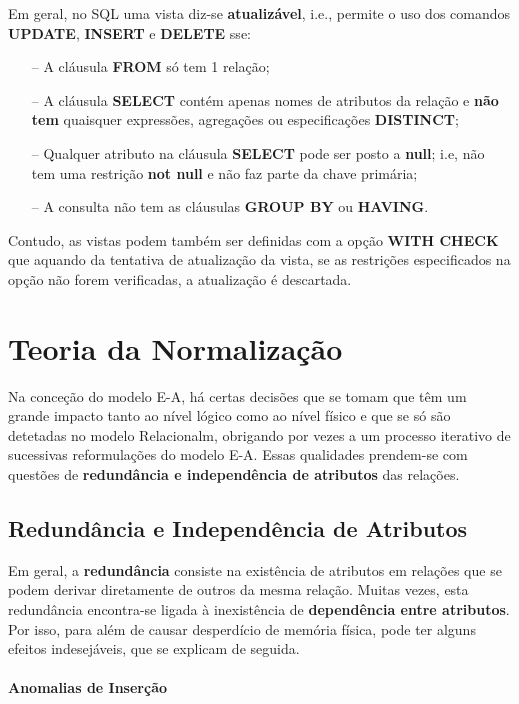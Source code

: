 \documentclass[oneside]{book}
\theoremstyle{definition}
\begin{document}
Em geral, no SQL uma vista diz-se \textbf{atualizável}, i.e., permite o uso dos comandos \textbf{UPDATE}, \textbf{INSERT} e \textbf{DELETE} sse:
\begin{itemize}
    \itemsep0cm
    \item[--] A cláusula \textbf{FROM} só tem 1 relação;
    \item[--] A cláusula \textbf{SELECT} contém apenas nomes de atributos da relação e \textbf{não tem} quaisquer expressões, agregações ou especificações \textbf{DISTINCT};
    \item[--] Qualquer atributo na cláusula \textbf{SELECT} pode ser posto a \textbf{null}; i.e, não tem uma restrição \textbf{not null} e não faz parte da chave primária;
    \item[--] A consulta não tem as cláusulas \textbf{GROUP BY} ou \textbf{HAVING}.
\end{itemize}

Contudo, as vistas podem também ser definidas com a opção \textbf{WITH CHECK} que aquando da tentativa de atualização da vista, se as restrições especificados na opção não forem verificadas, a atualização é descartada.

\chapter{Teoria da Normalização}

Na conceção do modelo E-A, há certas decisões que se tomam que têm um grande impacto tanto ao nível lógico como ao nível físico e que se só são detetadas no modelo Relacionalm, obrigando por vezes a um processo iterativo de sucessivas reformulações do modelo E-A. Essas qualidades prendem-se com questões de \textbf{redundância e independência de atributos} das relações.

\section{Redundância e Independência de Atributos}

Em geral, a \textbf{redundância} consiste na existência de atributos em relações que se podem derivar diretamente de outros da mesma relação. Muitas vezes, esta redundância encontra-se ligada à inexistência de \textbf{dependência entre atributos}. Por isso, para além de causar desperdício de memória física, pode ter alguns efeitos indesejáveis, que se explicam de seguida.

\subsubsection{Anomalias de Inserção}
\end{document}
